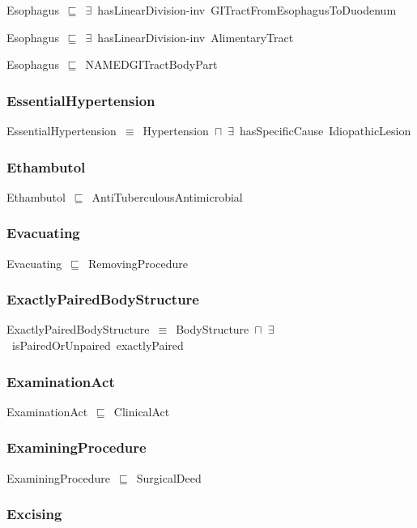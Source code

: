 \documentclass{article}
\begin{document}
Esophagus~\ensuremath{\sqsubseteq}~\ensuremath{\exists}~hasLinearDivision-inv~GITractFromEsophagusToDuodenum~

Esophagus~\ensuremath{\sqsubseteq}~\ensuremath{\exists}~hasLinearDivision-inv~AlimentaryTract~

Esophagus~\ensuremath{\sqsubseteq}~NAMEDGITractBodyPart~

\subsubsection*{EssentialHypertension}

EssentialHypertension~\ensuremath{\equiv}~Hypertension~\ensuremath{\sqcap}~\ensuremath{\exists}~hasSpecificCause~IdiopathicLesion

\subsubsection*{Ethambutol}

Ethambutol~\ensuremath{\sqsubseteq}~AntiTuberculousAntimicrobial~

\subsubsection*{Evacuating}

Evacuating~\ensuremath{\sqsubseteq}~RemovingProcedure~

\subsubsection*{ExactlyPairedBodyStructure}

ExactlyPairedBodyStructure~\ensuremath{\equiv}~BodyStructure~\ensuremath{\sqcap}~\ensuremath{\exists}~isPairedOrUnpaired~exactlyPaired

\subsubsection*{ExaminationAct}

ExaminationAct~\ensuremath{\sqsubseteq}~ClinicalAct~

\subsubsection*{ExaminingProcedure}

ExaminingProcedure~\ensuremath{\sqsubseteq}~SurgicalDeed~

\subsubsection*{Excising}
\end{document}
